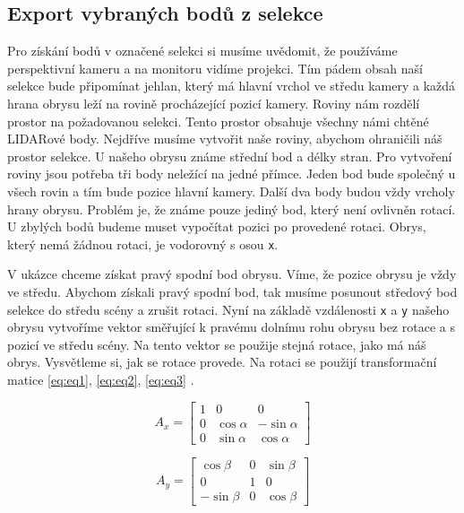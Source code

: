 \documentclass[czech,bachelor,dept420,male,cpdeclaration]{diploma}
\begin{document}
\subsection{Export vybraných bodů z selekce}
Pro získání bodů v označené selekci si musíme uvědomit, že používáme perspektivní kameru a na monitoru vidíme projekci. Tím pádem obsah naší selekce bude připomínat jehlan, který má hlavní vrchol ve středu kamery a každá hrana obrysu leží na rovině procházející pozicí kamery. Roviny nám rozdělí prostor na požadovanou selekci. Tento prostor obsahuje všechny námi chtěné LIDARové body. Nejdříve musíme vytvořit naše roviny, abychom ohraničili náš prostor selekce. U našeho obrysu známe střední bod a délky stran. Pro vytvoření roviny jsou potřeba tři body neležící na jedné přímce. Jeden bod bude společný u všech rovin a tím bude pozice hlavní kamery. Další dva body budou vždy vrcholy hrany obrysu. Problém je, že známe pouze jediný bod, který není ovlivněn rotací. U zbylých bodů budeme muset vypočítat pozici po provedené rotaci. Obrys, který nemá žádnou rotaci, je vodorovný s osou \texttt{x}. 


 


V ukázce chceme získat pravý spodní bod obrysu. Víme, že pozice obrysu je vždy ve středu. Abychom získali pravý spodní bod, tak musíme posunout středový bod selekce do středu scény a zrušit rotaci. Nyní na základě vzdálenosti \texttt{x} a \texttt{y} našeho obrysu vytvoříme vektor směřující k pravému dolnímu rohu obrysu bez rotace a s pozicí ve středu scény. Na tento vektor se použije stejná rotace, jako má náš obrys. Vysvětleme si, jak se rotace provede. Na rotaci se použijí transformační matice \eqref{eq:eq1}, \eqref{eq:eq2}, \eqref{eq:eq3} \cite{sojka_2003}.

\begin{equation}
		A_x =
		\begin{bmatrix}%
    1 & 0 & 0 \\
		0 & \cos \alpha & -\sin \alpha \\ 
		0 & \sin \alpha & \cos \alpha
    \end{bmatrix}
\label{eq:eq1}
\end{equation}

\begin{equation}
		A_y =
		\begin{bmatrix}%
    \cos \beta & 0 & \sin \beta \\
		0 & 1 & 0 \\ 
		-\sin \beta & 0 & \cos \beta
    \end{bmatrix}
\label{eq:eq2}
\end{equation}
\end{document}
